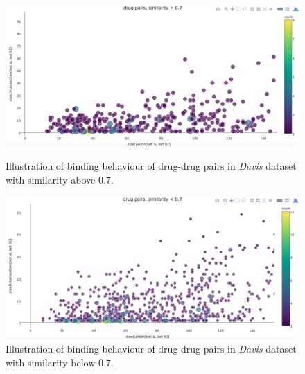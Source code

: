 \begin{figure}[p]
\begin{center}
\includegraphics[scale=0.36]{davis_simi_above.png}
\end{center}
\caption[Correlation of drug-similarity and binding behaviour, similar drug pairs, \textit{Davis} dataset]{Illustration of binding behaviour of drug-drug pairs in \textit{Davis} dataset  with similarity above $0.7$.}
\label{fig:davis_drug_simi_corr_1}
\begin{center}
\includegraphics[scale=0.36]{davis_simi_below.png}
\end{center}
\caption[Correlation of drug-similarity and binding behaviour, un-similar drug pairs \textit{Davis} dataset]{Illustration of binding behaviour of drug-drug pairs in \textit{Davis} dataset  with similarity below $0.7$.}
\label{fig:davis_drug_simi_corr_2}
\end{figure}


